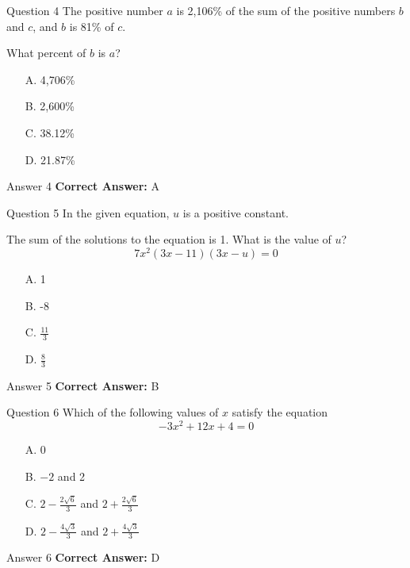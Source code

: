 \documentclass{beamer}
\begin{document}
\begin{frame}{Question 4}
\small
The positive number \(a\) is 2,106\% of the sum of the positive numbers \(b\) and \(c\), and \(b\) is 81\% of \(c\).

What percent of \(b\) is \(a\)?
\vspace{0.35cm}
\begin{enumerate}
    \item[A.] 4,706\%
    \item[B.] 2,600\%
    \item[C.] 38.12\%
    \item[D.] 21.87\%
\end{enumerate}
\end{frame}
\begin{frame}{Answer 4}
\small
\textbf{Correct Answer:} A
\end{frame}

\begin{frame}{Question 5}
\small
In the given equation, \(u\) is a positive constant.

The sum of the solutions to the equation is 1. What is the value of \(u\)?
\[
7x^2(3x - 11)(3x - u) = 0
\]
\vspace{0.35cm}
\begin{enumerate}
    \item[A.] 1
    \item[B.] -8
    \item[C.] \(\frac{11}{3}\)
    \item[D.] \(\frac{8}{3}\)
\end{enumerate}
\end{frame}
\begin{frame}{Answer 5}
\small
\textbf{Correct Answer:} B
\end{frame}

\begin{frame}{Question 6}
\small
Which of the following values of \(x\) satisfy the equation
\[
-3x^2 + 12x + 4 = 0
\]
\vspace{0.35cm}
\begin{enumerate}
    \item[A.] 0
    \item[B.] \(-2\) and 2
    \item[C.] \(2 - \frac{2\sqrt{6}}{3}\) and \(2 + \frac{2\sqrt{6}}{3}\)
    \item[D.] \(2 - \frac{4\sqrt{3}}{3}\) and \(2 + \frac{4\sqrt{3}}{3}\)
\end{enumerate}
\end{frame}
\begin{frame}{Answer 6}
\small
\textbf{Correct Answer:} D
\end{frame}
\end{document}
